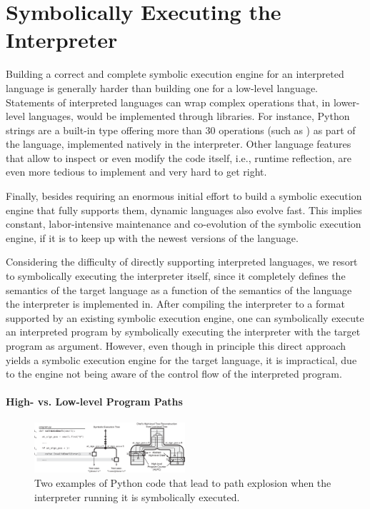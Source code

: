 
\iffalse
\section{Symbolically Executing the Interpreter}

Building a correct and complete symbolic execution engine for an interpreted language is generally harder than building one for a low-level language. 
%
Statements of interpreted languages can wrap complex operations that, in lower-level languages, would be implemented through libraries. For instance, Python strings are a built-in type offering more than 30 operations (such as ) as part of the language, implemented natively in the interpreter. 
%
Other language features that allow to inspect or even modify the code itself, i.e., runtime reflection, are even more tedious to implement and very hard to get right.

Finally, besides requiring an enormous initial effort to build a symbolic execution engine that fully supports them, dynamic languages also evolve fast. This implies constant, labor-intensive maintenance and co-evolution of the symbolic execution engine, if it is to keep up with the newest versions of the language.

Considering the difficulty of directly supporting interpreted languages, we resort to symbolically executing the interpreter itself, since it completely defines the semantics of the target language as a function of the semantics of the language the interpreter is implemented in.
%
After compiling the interpreter to a format supported by an existing symbolic execution engine, one can symbolically execute an interpreted program by symbolically executing the interpreter with the target program as argument.
%
However, even though in principle this direct approach yields a symbolic execution engine for the target language, it is impractical, due to the engine not being aware of the control flow of the interpreted program.

\paragraph{High- vs. Low-level Program Paths}

\begin{figure}
  \centering
  \includegraphics[width=2.2in]{chef/figures/running-example}
  \caption{Two examples of Python code that lead to path explosion when the interpreter running it is symbolically executed.}
  \label{fig:running-examples}
\end{figure}


